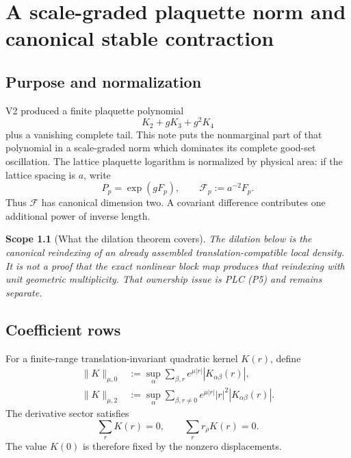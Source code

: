 \documentclass[11pt,oneside]{book}
\newtheorem{scope}[theorem]{Scope}
\theoremstyle{definition}
\theoremstyle{remark}
\begin{document}
\clearpage

\chapter{A scale-graded plaquette norm and canonical stable
contraction}
\label{ch:e8v3}

\section{Purpose and normalization}
\label{sec:e8v3-purpose}

V2 produced a finite plaquette polynomial
\[
 K_2+gK_3+g^2K_4
\]
plus a vanishing complete tail.  This note puts the nonmarginal part
of that polynomial in a scale-graded norm which dominates its complete
good-set oscillation.  The lattice plaquette logarithm is normalized
by physical area: if the lattice spacing is \(a\), write
\[
 P_p=\exp(gF_p),\qquad {\mathcal F}_p:=a^{-2}F_p.
                                                        \label{eq:e8v3-area}
\]
Thus \({\mathcal F}\) has canonical dimension two.  A covariant
difference contributes one additional power of inverse length.

\begin{scope}[What the dilation theorem covers]
\label{scope:e8v3}
The dilation below is the canonical reindexing of an already assembled
translation-compatible local density.  It is not a proof that the
exact nonlinear block map produces that reindexing with unit geometric
multiplicity.  That ownership issue is PLC (P5) and remains separate.
\end{scope}

\section{Coefficient rows}
\label{sec:e8v3-coefficients}

For a finite-range translation-invariant quadratic kernel \(K(r)\),
define
\begin{align}
 \|K\|_{\mu,0}
 &:=
 \sup_\alpha\sum_{\beta,r}
 e^{\mu|r|}|K_{\alpha\beta}(r)|,                     \label{eq:e8v3-K0}\\
 \|K\|_{\mu,2}
 &:=
 \sup_\alpha\sum_{\beta,r\neq0}
 e^{\mu|r|}|r|^2|K_{\alpha\beta}(r)|.                \label{eq:e8v3-K2}
\end{align}
The derivative sector satisfies
\[
 \sum_rK(r)=0,\qquad \sum_rr_\rho K(r)=0.            \label{eq:e8v3-moments}
\]
The value \(K(0)\) is therefore fixed by the nonzero displacements.
\end{document}
